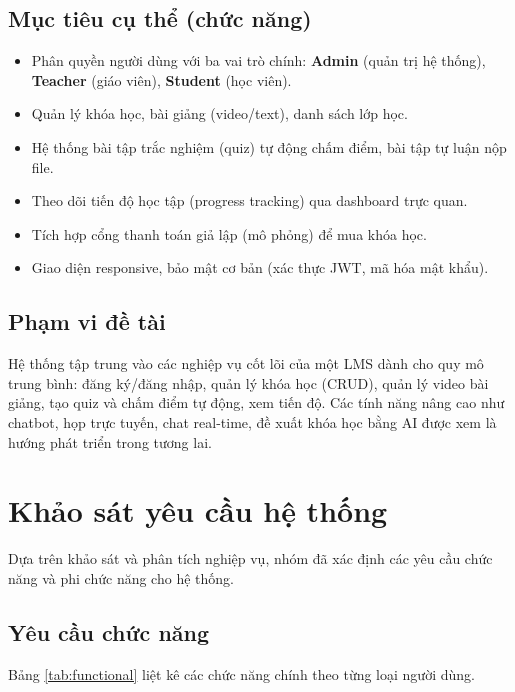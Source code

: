 \subsection{Mục tiêu cụ thể (chức năng)}
\begin{itemize}
    \item Phân quyền người dùng với ba vai trò chính: \textbf{Admin} (quản trị hệ thống), \textbf{Teacher} (giáo viên), \textbf{Student} (học viên).
    \item Quản lý khóa học, bài giảng (video/text), danh sách lớp học.
    \item Hệ thống bài tập trắc nghiệm (quiz) tự động chấm điểm, bài tập tự luận nộp file.
    \item Theo dõi tiến độ học tập (progress tracking) qua dashboard trực quan.
    \item Tích hợp cổng thanh toán giả lập (mô phỏng) để mua khóa học.
    \item Giao diện responsive, bảo mật cơ bản (xác thực JWT, mã hóa mật khẩu).
\end{itemize}

\subsection{Phạm vi đề tài}
Hệ thống tập trung vào các nghiệp vụ cốt lõi của một LMS dành cho quy mô trung bình: đăng ký/đăng nhập, quản lý khóa học (CRUD), quản lý video bài giảng, tạo quiz và chấm điểm tự động, xem tiến độ. Các tính năng nâng cao như chatbot, họp trực tuyến, chat real-time, đề xuất khóa học bằng AI được xem là hướng phát triển trong tương lai.

\section{Khảo sát yêu cầu hệ thống}
Dựa trên khảo sát và phân tích nghiệp vụ, nhóm đã xác định các yêu cầu chức năng và phi chức năng cho hệ thống.

\subsection{Yêu cầu chức năng}
Bảng \ref{tab:functional} liệt kê các chức năng chính theo từng loại người dùng.

